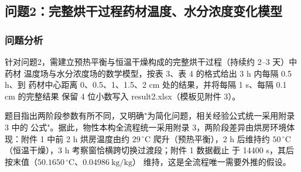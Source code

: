 \subsection{问题2：完整烘干过程药材温度、水分浓度变化模型}

\subsubsection{问题分析}

针对问题2，需建立预热平衡与恒温干燥构成的完整烘干过程（持续约 2–3 天）中药材
温度场与水分浓度场的数学模型，按表 3、表 4 的格式给出 3 h 内每隔 0.5 h、到
药材中心距离 0、0.5、1、1.5、2 cm 处的结果，并将每隔 1 s、每隔 0.1 cm 的完整结果
保留 4 位小数写入 result2.xlsx（模板见附件 3）。

题目指出两阶段参数有所不同，又明确"为简化问题，相关经验公式统一采用附录 3 中的
公式"。据此，物性本构全流程统一采用附录 3，两阶段差异由烘房环境体现：附件 1 中前
2 h 烘房温度由约 $29\,^{\circ}\mathrm{C}$ 爬升（预热平衡），2 h 后维持约
$50\,^{\circ}\mathrm{C}$（恒温干燥），3 h 考察窗恰横跨切换过渡段；附件 1 数据截止
于 14400 s，其后按末值（$50.1650\,^{\circ}\mathrm{C}$、$0.04986\ \mathrm{kg/kg}$）
维持，这是全流程唯一需要外推的假设。

